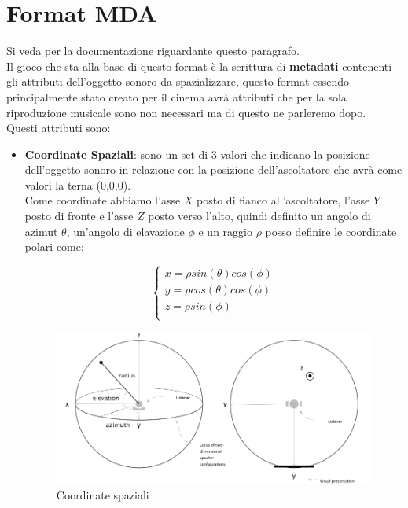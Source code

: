 \documentclass[12pt,a4paper]{report}
\begin{document}
\section{Format MDA}

Si veda \cite{mda} per la documentazione riguardante questo paragrafo.\\

Il gioco che sta alla base di questo format è la scrittura di \textbf{metadati} contenenti gli attributi dell'oggetto sonoro da spazializzare, questo format essendo principalmente stato creato per il cinema avrà attributi che per la sola riproduzione musicale sono non necessari ma di questo ne parleremo dopo.\\

Questi attributi sono:
\begin{itemize}\label{aaa}
\item \textbf{Coordinate Spaziali}: sono un set di 3 valori che indicano la posizione dell'oggetto sonoro in relazione con la posizione dell'ascoltatore che avrà come valori la terna (0,0,0).\\

Come coordinate abbiamo l'asse $X$ posto di fianco all'ascoltatore, l'asse $Y$ posto di fronte e l'asse $Z$ posto verso l'alto, quindi definito un angolo di azimut $\theta$, un'angolo di elavazione $\phi$ e un raggio $\rho$
posso definire le coordinate polari come:

\begin{equation}
	\left\{\begin{matrix}
x= \rho sin(\theta) cos(\phi) \\
y= \rho cos(\theta) cos(\phi)\\
z= \rho sin(\phi)\\
\end{matrix}\right.
	\label{eq:coordinatepolari}
\end{equation}

\begin{figure}[htbp]
	\centering
	\includegraphics[scale=0.35]{figures/azimut.png}
	\caption {Coordinate spaziali} 
	\label{fig:coordinate}
	\end{figure}
	

\end{itemize}
\end{document}
